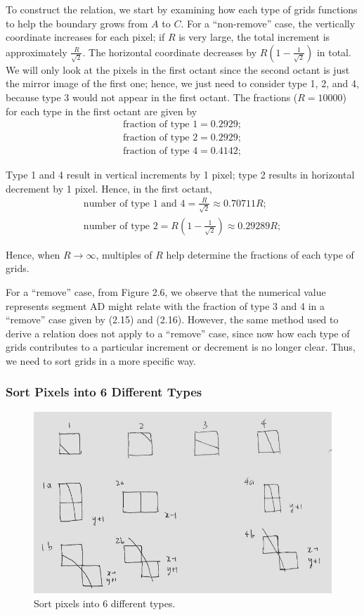 \documentclass[letterpaper]{article}
\numberwithin{equation}{section} %
\numberwithin{figure}{section} %
\numberwithin{table}{section} %
\begin{document}
\noindent
To construct the relation, we start by examining how each type of grids functions to help the boundary grows from $A$ to $C$. For a \enquote{non-remove} case, the vertically coordinate increases for each pixel; if $R$ is very large, the total increment is approximately $\frac{R}{\sqrt{2}}$. The horizontal coordinate decreases by $R(1-\frac{1}{\sqrt{2}})$ in total. We will only look at the pixels in the first octant since the second octant is just the mirror image of the first one; hence, we just need to consider type 1, 2, and 4, because type 3 would not appear in the first octant. The fractions ($R=10000$) for each type in the first octant are given by 
\begin{align} 
\text{fraction of type 1} = 0.2929;\\
\text{fraction of type 2} = 0.2929;\\
\text{fraction of type 4} = 0.4142;
\end{align}

\noindent
Type 1 and 4 result in vertical increments by 1 pixel; type 2 results in horizontal decrement by 1 pixel. Hence, in the first octant, 
\begin{align} 
\text{number of type 1 and 4}=\frac{R}{\sqrt{2}} \approx 0.70711R;\\
\text{number of type 2}=R(1-\frac{1}{\sqrt{2}}) \approx 0.29289R;
\end{align}

\noindent
Hence, when $R \rightarrow \infty$, multiples of $R$ help determine the fractions of each type of grids. 



For a \enquote{remove} case, from Figure 2.6, we observe that the numerical value represents segment AD might relate with the fraction of type 3 and 4 in a \enquote{remove} case given by (2.15) and (2.16). However, the same method used to derive a relation does not apply to a \enquote{remove} case, since now how each type of grids contributes to a particular increment or decrement is no longer clear. Thus, we need to sort grids in a more specific way. 



\subsubsection{Sort Pixels into 6 Different Types}

\begin{figure}[h]
	\centering
	\includegraphics[width=0.5\linewidth]{6ty}
	\caption{Sort pixels into 6 different types.}
	\label{fig:6ty}
\end{figure}
\end{document}

